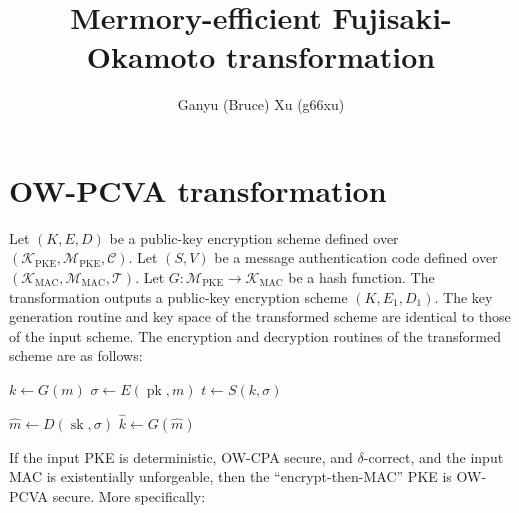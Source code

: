 \documentclass{article}
\title{Mermory-efficient Fujisaki-Okamoto transformation}
\author{Ganyu (Bruce) Xu (g66xu)}
\newcommand{\pk}{\operatorname{pk}}
\newcommand{\sk}{\operatorname{sk}}
\begin{document}
\maketitle

\section{OW-PCVA transformation}\label{sec:ow-pcva-transformation}
Let $(K, E, D)$ be a public-key encryption scheme defined over $(\mathcal{K}_\text{PKE}, \mathcal{M}_\text{PKE}, \mathcal{C})$. Let $(S, V)$ be a message authentication code defined over $(\mathcal{K}_\text{MAC}, \mathcal{M}_\text{MAC}, \mathcal{T})$. Let $G: \mathcal{M}_\text{PKE} \rightarrow \mathcal{K}_\text{MAC}$ be a hash function. The transformation outputs a public-key encryption scheme $(K, E_1, D_1)$. The key generation routine and key space of the transformed scheme are identical to those of the input scheme. The encryption and decryption routines of the transformed scheme are as follows:

\begin{multicols}{2}
    \begin{algorithm}[H]
        \caption{$E_1$}
        \SetAlgoLined
        \KwIn{
            $\pk, m \in \mathcal{M}_\text{PKE}$
        }
        $k \leftarrow G(m)$\;
        $\sigma \leftarrow E(\pk, m)$\;
        $t \leftarrow S(k, \sigma)$\;
        \;
    \end{algorithm}

    \begin{algorithm}[H]
        \caption{$D_1$}
        \SetAlgoLined
        \KwIn{
            $\sk, c = (\sigma \in \mathcal{C}, t \in \mathcal{T})$
        }
        $\hat{m} \leftarrow D(\sk, \sigma)$\;
        $\hat{k} \leftarrow G(\hat{m})$\;
        \;
    \end{algorithm}
\end{multicols}

If the input PKE is deterministic, OW-CPA secure, and $\delta$-correct, and the input MAC is existentially unforgeable, then the ``encrypt-then-MAC'' PKE is OW-PCVA secure. More specifically:
\end{document}
